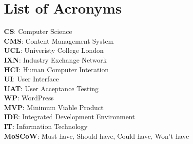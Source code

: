 \documentclass[fontsize=11pt]{extarticle}
\numberwithin{figure}{section} %
\numberwithin{table}{section}%
\begin{document}
\newpage

\section*{List of Acronyms}\label{acronyms}
\textbf{CS}: Computer Science \\
\textbf{CMS}: Content Management System \\
\textbf{UCL}: Univeristy College London \\
\textbf{IXN}: Industry Exchange Network \\
\textbf{HCI}: Human Computer Interation \\
\textbf{UI}: User Interface \\
\textbf{UAT}: User Acceptance Testing \\
\textbf{WP}: WordPress \\
\textbf{MVP}: Minimum Viable Product \\
\textbf{IDE}: Integrated Development Environment \\
\textbf{IT}: Information Technology \\
\textbf{MoSCoW}: Must have, Should have, Could have, Won't have \\


\newpage

\clearpage
{}
\end{document}
